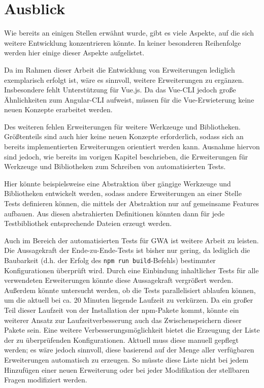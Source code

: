 \section{Ausblick}
\label{further_research}

Wie bereits an einigen Stellen erwähnt wurde, gibt es viele Aspekte, auf die sich weitere Entwicklung konzentrieren könnte. In keiner besonderen Reihenfolge werden hier einige dieser Aspekte aufgelistet.

Da im Rahmen dieser Arbeit die Entwicklung von Erweiterungen lediglich exemplarisch erfolgt ist, wäre es sinnvoll, weitere Erweiterungen zu ergänzen. Insbesondere fehlt Unterstützung für Vue.js. Da das Vue-\gls{CLI} jedoch große Ähnlichkeiten zum Angular-\gls{CLI} aufweist, müssen für die Vue-Erwieterung keine neuen Konzepte erarbeitet werden.

Des weiteren fehlen Erweiterungen für weitere Werkzeuge und Bibliotheken. Größtenteils sind auch hier keine neuen Konzepte erforderlich, sodass sich an bereits implementierten Erweiterungen orientiert werden kann. Ausnahme hiervon sind jedoch, wie bereits im vorigen Kapitel beschrieben, die Erweiterungen für Werkzeuge und Bibliotheken zum Schreiben von automatisierten Tests.

Hier könnte beispielsweise eine Abstraktion über gängige Werkzeuge und Bibliotheken entwickelt werden, sodass andere Erweiterungen an einer Stelle Tests definieren können, die mittels der Abstraktion nur auf gemeinsame Features aufbauen. Aus diesen abstrahierten Definitionen könnten dann für jede Testbibliothek entsprechende Dateien erzeugt werden.

Auch im Bereich der automatisierten Tests für \gls{GWA} ist weitere Arbeit zu leisten. Die Aussagekraft der Ende-zu-Ende-Tests ist bisher nur gering, da lediglich die Baubarkeit (d.h. der Erfolg des \verb/npm run build/-Befehls) bestimmter Konfigurationen überprüft wird. Durch eine Einbindung inhaltlicher Tests für alle verwendeten Erweiterungen könnte diese Aussagekraft vergrößert werden. Außerdem könnte untersucht werden, ob die Tests parallelisiert ablaufen können, um die aktuell bei ca. 20 Minuten liegende Laufzeit zu verkürzen. Da ein großer Teil dieser Laufzeit von der Installation der \gls{npm}-Pakete kommt, könnte ein weiterer Ansatz zur Laufzeitverbesserung auch das Zwischenspeichern dieser Pakete sein. Eine weitere Verbesserungsmöglichkeit bietet die Erzeugung der Liste der zu überprüfenden Konfigurationen. Aktuell muss diese manuell gepflegt werden; es wäre jedoch sinnvoll, diese basierend auf der Menge aller verfügbaren Erweiterungen automatisch zu erzeugen. So müsste diese Liste nicht bei jedem Hinzufügen einer neuen Erweiterung oder bei jeder Modifikation der stellbaren Fragen modifiziert werden.

